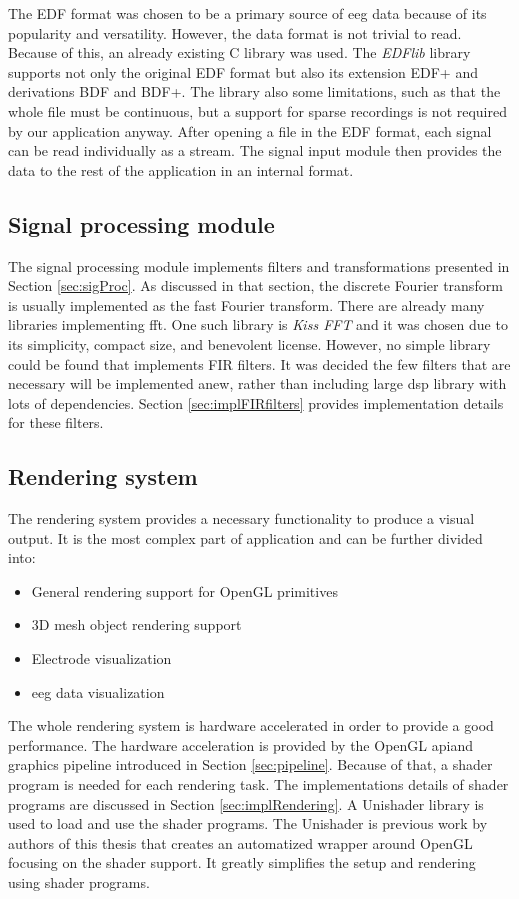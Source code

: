 The EDF format was chosen to be a primary source of \gls{eeg} data because of its popularity and versatility. However, the data format is not trivial to read. Because of this, an already existing C library was used. The \emph{EDFlib} library supports not only the original EDF format but also its extension EDF+ and derivations BDF and BDF+. The library also some limitations, such as that the whole file must be continuous, but a support for sparse recordings is not required by our application anyway. After opening a file in the EDF format, each signal can be read individually as a stream. The signal input module then provides the data to the rest of the application in an internal format.

\subsection{Signal processing module}
The signal processing module implements filters and transformations presented in Section \ref{sec:sigProc}. As discussed in that section, the discrete Fourier transform is usually implemented as the fast Fourier transform. There are already many libraries implementing \gls{fft}. One such library is \emph{Kiss FFT} and it was chosen due to its simplicity, compact size, and benevolent license. However, no simple library could be found that implements FIR filters. It was decided the few filters that are necessary will be implemented anew, rather than including large \gls{dsp} library with lots of dependencies. Section \ref{sec:implFIRfilters} provides implementation details for these filters.

\subsection{Rendering system}
The rendering system provides a necessary functionality to produce a visual output. It is the most complex part of application and can be further divided into:
\begin{itemize}
	\item General rendering support for OpenGL primitives
	\item 3D mesh object rendering support
	\item Electrode visualization
	\item \gls{eeg} data visualization
\end{itemize}

The whole rendering system is hardware accelerated in order to provide a good performance. The hardware acceleration is provided by the OpenGL \gls{api}and graphics pipeline introduced in Section \ref{sec:pipeline}. Because of that, a shader program is needed for each rendering task. The implementations details of shader programs are discussed in Section \ref{sec:implRendering}. A Unishader library is used to load and use the shader programs. The Unishader is previous work by authors of this thesis that creates an automatized wrapper around OpenGL focusing on the shader support. It greatly simplifies the setup and rendering using shader programs.

